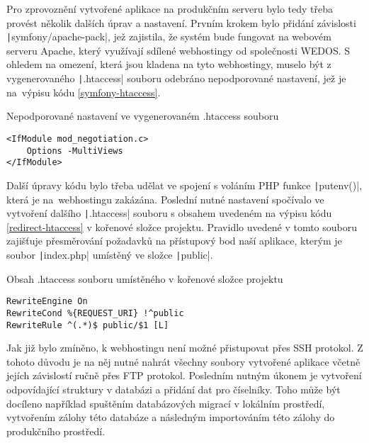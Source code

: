 Pro zprovoznění vytvořené aplikace na produkčním serveru bylo tedy třeba provést několik dalších úprav a nastavení. Prvním krokem bylo přidání závislosti \texttt|symfony/apache-pack|, jež zajistila, že systém bude fungovat na webovém serveru Apache, který využívají sdílené webhostingy od společnosti WEDOS. S ohledem na omezení, která jsou kladena na tyto webhostingy, muselo být z vygenerovaného \texttt|.htaccess| souboru odebráno nepodporované nastavení, jež je na~výpisu kódu \ref{symfony-htaccess}. \cite{symfony_wedos}

\begin{listing}[h]
    \caption{Nepodporované nastavení ve vygenerovaném .htaccess souboru}\label{symfony-htaccess}
    \begin{verbatim}
<IfModule mod_negotiation.c>
    Options -MultiViews
</IfModule>
    \end{verbatim}
\end{listing}

\vspace{-2mm}

Další úpravy kódu bylo třeba udělat ve spojení s voláním PHP funkce \texttt|putenv()|, která je na~webhostingu zakázána. Poslední nutné nastavení spočívalo ve vytvoření dalšího \texttt|.htaccess| souboru s obsahem uvedeném na výpisu kódu \ref{redirect-htaccess} v kořenové složce projektu. Pravidlo uvedené v tomto souboru zajišťuje přesměrování požadavků na přístupový bod naší aplikace, kterým je soubor \texttt|index.php| umístěný ve složce \texttt|public|. \cite{symfony_wedos}

\begin{listing}[h]
    \caption{Obsah .htaccess souboru umístěného v kořenové složce projektu}\label{redirect-htaccess}
    \begin{verbatim}
RewriteEngine On
RewriteCond %{REQUEST_URI} !^public
RewriteRule ^(.*)$ public/$1 [L]
    \end{verbatim}
\end{listing}

Jak již bylo zmíněno, k webhostingu není možné přistupovat přes SSH protokol. Z tohoto důvodu je na něj nutné nahrát všechny soubory vytvořené aplikace včetně jejích závislostí ručně přes FTP protokol. Posledním nutným úkonem je vytvoření odpovídající struktury v databázi a přidání dat pro číselníky. Toho může být docíleno například spuštěním databázových migrací v lokálním prostředí, vytvořením zálohy této databáze a následným importováním této zálohy do produkčního prostředí.
